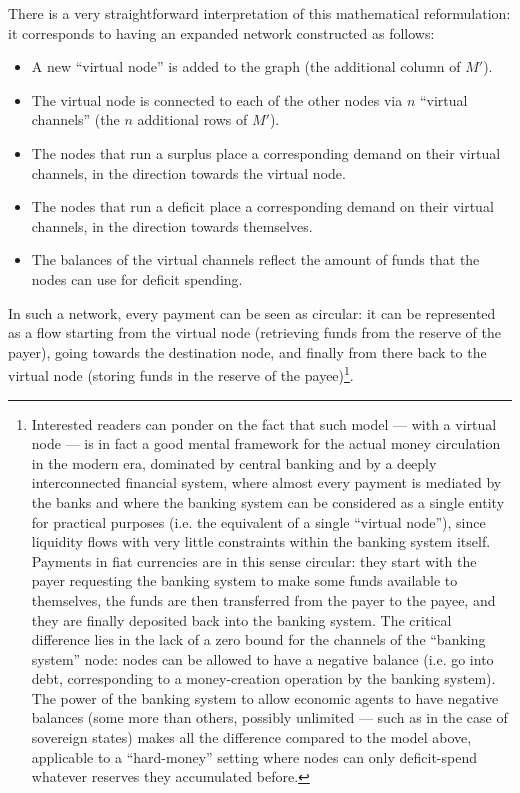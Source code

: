 \documentclass[a4paper]{article}
\begin{document}
There is a very straightforward interpretation of this mathematical reformulation: it corresponds to having an expanded network constructed as follows:
\begin{itemize}
\item A new ``virtual node'' is added to the graph (the additional column of $M'$).
\item The virtual node is connected to each of the other nodes via $n$ ``virtual channels'' (the $n$ additional rows of $M'$).
\item The nodes that run a surplus place a corresponding demand on their virtual channels, in the direction towards the virtual node.
\item The nodes that run a deficit place a corresponding demand on their virtual channels, in the direction towards themselves.
\item The balances of the virtual channels reflect the amount of funds that the nodes can use for deficit spending.
\end{itemize}

In such a network, every payment can be seen as circular: it can be represented as a flow starting from the virtual node (retrieving funds from the reserve of the payer), going towards the destination node, and finally from there back to the virtual node (storing funds in the reserve of the payee)\footnote{Interested readers can ponder on the fact that such model --- with a virtual node --- is in fact a good mental framework for the actual money circulation in the modern era, dominated by central banking and by a deeply interconnected financial system, where almost every payment is mediated by the banks and where the banking system can be considered as a single entity for practical purposes (i.e. the equivalent of a single ``virtual node''), since liquidity flows with very little constraints within the banking system itself. Payments in fiat currencies are in this sense circular: they start with the payer requesting the banking system to make some funds available to themselves, the funds are then transferred from the payer to the payee, and they are finally deposited back into the banking system. The critical difference lies in the lack of a zero bound for the channels of the ``banking system'' node: nodes can be allowed to have a negative balance (i.e. go into debt, corresponding to a money-creation operation by the banking system). The power of the banking system to allow economic agents to have negative balances (some more than others, possibly unlimited --- such as in the case of sovereign states) makes all the difference compared to the model above, applicable to a ``hard-money'' setting where nodes can only deficit-spend whatever reserves they accumulated before.}.
\end{document}
